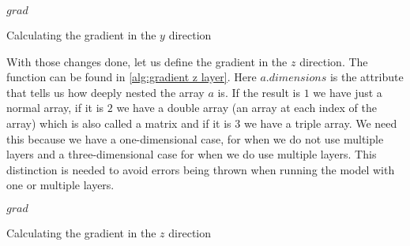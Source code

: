 \begin{algorithm}[hbt]
    \Return $grad$ \;
    \caption{Calculating the gradient in the $y$ direction}
    \label{alg:gradient y layer}
\end{algorithm}

With those changes done, let us define the gradient in the $z$ direction. The function can be found in \autoref{alg:gradient z layer}. Here $a.dimensions$ is the attribute that tells us how 
deeply nested the array $a$ is. If the result is $1$ we have just a normal array, if it is $2$ we have a double array (an array at each index of the array) which is also called a matrix and if it 
is $3$ we have a triple array. We need this because we have a one-dimensional case, for when we do not use multiple layers and a three-dimensional case for when we do use multiple layers. This 
distinction is needed to avoid errors being thrown when running the model with one or multiple layers.

\begin{algorithm}[hbt]
     
    
    \Return $grad$ \;
    \caption{Calculating the gradient in the $z$ direction}
    \label{alg:gradient z layer}
\end{algorithm}

